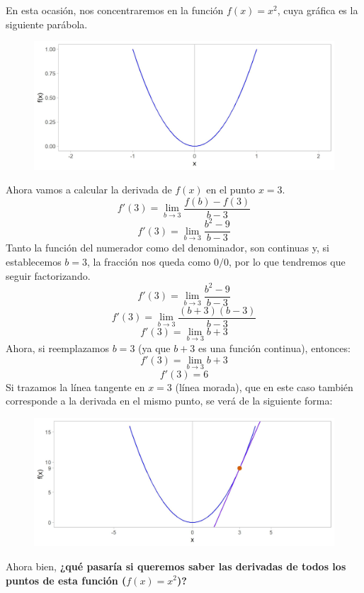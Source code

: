 \documentclass[12pt]{article}
\begin{document}
En esta ocasión, nos concentraremos en la función $f(x)= x^{2}$, cuya gráfica es la siguiente parábola.

\begin{figure}[hbt!]
\centering
\includegraphics[scale=0.7]{img/sec_power_fun.jpg}
\end{figure}

Ahora vamos a calcular la derivada de $f(x)$ en el punto $x = 3$.
\[f'(3) = \lim_{b \to 3} \frac{f(b)-f(3)}{b-3}\]
\[f'(3) = \lim_{b \to 3} \frac{b^{2}-9}{b-3}\]
Tanto la función del numerador como del denominador, son continuas y, si establecemos $b = 3$, la fracción nos queda como $0/0$, por lo que tendremos que seguir factorizando.
\[f'(3) = \lim_{b \to 3} \frac{b^{2}-9}{b-3}\]
\[f'(3) = \lim_{b \to 3} \frac{(b+3)(b-3)}{b-3}\]
\[f'(3) = \lim_{b \to 3} b+3\]
Ahora, si reemplazamos $b = 3$ (ya que $b+3$ es una función continua), entonces:
\[f'(3) = \lim_{b \to 3} b+3\]
\[f'(3) = 6\]
Si trazamos la línea tangente en $x = 3$ (línea morada), que en este caso también corresponde a la derivada en el mismo punto, se verá de la siguiente forma:

\begin{figure}[hbt!]
\centering
\includegraphics[scale=0.7]{img/tang_secpow_one_pt.jpg}
\end{figure}

Ahora bien, \textbf{¿qué pasaría si queremos saber las derivadas de todos los puntos de esta función ($f(x) = x^{2}$)?}
\end{document}
